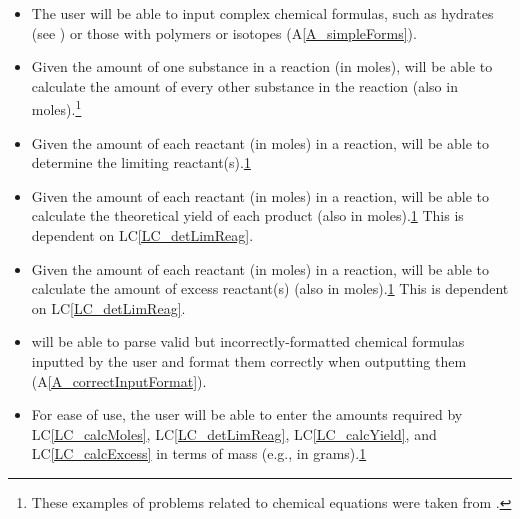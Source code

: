\documentclass[12pt]{article}
\newcommand{\aref}[1]{A\ref{#1}}
\newcounter{lcnum} %
\newcommand{\lcref}[1]{LC\ref{#1}}
\begin{document}
\noindent \begin{itemize}

\item[LC\refstepcounter{lcnum}\thelcnum\label{LC_complexForms}:] The user will
	be able to input complex chemical formulas, such as hydrates (see
	) or those with polymers or isotopes
	(\aref{A_simpleForms}).

\item[LC\refstepcounter{lcnum}\thelcnum\label{LC_calcMoles}:] Given the amount
	of one substance in a reaction (in moles), \progname{} will be able to
	calculate the amount of every other substance in the reaction (also in
	moles).\footnote{\label{chemProbExs}These examples of problems related to
		chemical equations were taken from \cite{lund_introduction_2023}.}
		
\item[LC\refstepcounter{lcnum}\thelcnum\label{LC_detLimReag}:] Given the amount
	of each reactant (in moles) in a reaction, \progname{} will be able to
	determine the limiting reactant(s).\cref{chemProbExs}

\item[LC\refstepcounter{lcnum}\thelcnum\label{LC_calcYield}:] Given the amount
	of each 
	 reactant (in moles) in a reaction, \progname{} will be able to
	calculate the theoretical yield of each product (also in
	moles).\cref{chemProbExs} This is dependent on \lcref{LC_detLimReag}.
	
\item[LC\refstepcounter{lcnum}\thelcnum\label{LC_calcExcess}:] Given the amount
	of each 
	reactant (in moles) in a reaction, \progname{} will be able to
	calculate the amount of excess reactant(s) (also in	moles).\cref{chemProbExs}
	This is dependent on \lcref{LC_detLimReag}.
	
\item[LC\refstepcounter{lcnum}\thelcnum\label{LC_incorrectInputFormat}:] 
	\progname{} will be able to parse valid but incorrectly-formatted chemical
	formulas inputted by the user and format them correctly when outputting them
	(\aref{A_correctInputFormat}).
	
\item[LC\refstepcounter{lcnum}\thelcnum\label{LC_termsOfMass}:] For ease of use,
the user will be able to enter the amounts required by \lcref{LC_calcMoles}, 
\lcref{LC_detLimReag}, \lcref{LC_calcYield}, and \lcref{LC_calcExcess} in terms
of mass (e.g., in grams).\cref{chemProbExs}


\end{itemize}
\end{document}
